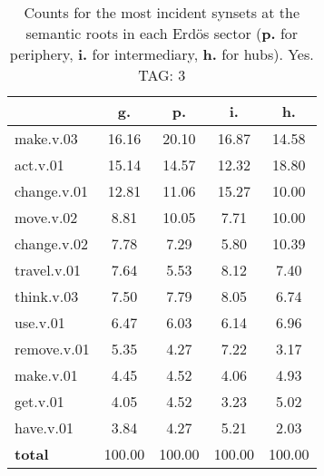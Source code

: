 \begin{table}[h!]
\begin{center}
\begin{tabular}{| l | c | c | c | c |}\hline
 & g. & p. & i. & h. \\\hline
make.v.03 & 16.16  & 20.10  & 16.87  & 14.58 \\\hline
act.v.01 & 15.14  & 14.57  & 12.32  & 18.80 \\\hline
change.v.01 & 12.81  & 11.06  & 15.27  & 10.00 \\\hline
move.v.02 & 8.81  & 10.05  & 7.71  & 10.00 \\\hline
change.v.02 & 7.78  & 7.29  & 5.80  & 10.39 \\\hline
travel.v.01 & 7.64  & 5.53  & 8.12  & 7.40 \\\hline
think.v.03 & 7.50  & 7.79  & 8.05  & 6.74 \\\hline
use.v.01 & 6.47  & 6.03  & 6.14  & 6.96 \\\hline
remove.v.01 & 5.35  & 4.27  & 7.22  & 3.17 \\\hline
make.v.01 & 4.45  & 4.52  & 4.06  & 4.93 \\\hline
get.v.01 & 4.05  & 4.52  & 3.23  & 5.02 \\\hline
have.v.01 & 3.84  & 4.27  & 5.21  & 2.03 \\\hline
{{\bf total}} & 100.00  & 100.00  & 100.00  & 100.00 \\\hline
\end{tabular}
\caption{Counts for the most incident synsets at the semantic roots in each Erd\"os sector ({\bf p.} for periphery, {\bf i.} for intermediary, {\bf h.} for hubs). Yes. TAG: 3}
\end{center}
\end{table}